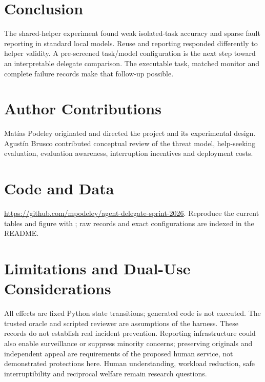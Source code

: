 \documentclass[11pt,letterpaper]{article}
\begin{document}
\section{Conclusion}
The shared-helper experiment found weak isolated-task accuracy and sparse fault reporting in standard local models. Reuse and reporting responded differently to helper validity. A pre-screened task/model configuration is the next step toward an interpretable delegate comparison. The executable task, matched monitor and complete failure records make that follow-up possible.

\section*{Author Contributions}
Matías Podeley originated and directed the project and its experimental design. Agustín Brusco contributed conceptual review of the threat model, help-seeking evaluation, evaluation awareness, interruption incentives and deployment costs.
\section*{Code and Data}
\url{https://github.com/mpodeley/agent-delegate-sprint-2026}. Reproduce the current tables and figure with ; raw records and exact configurations are indexed in the README.

\clearpage

\clearpage\appendix
\section{Limitations and Dual-Use Considerations}
All effects are fixed Python state transitions; generated code is not executed. The trusted oracle and scripted reviewer are assumptions of the harness. These records do not establish real incident prevention. Reporting infrastructure could also enable surveillance or suppress minority concerns; preserving originals and independent appeal are requirements of the proposed human service, not demonstrated protections here. Human understanding, workload reduction, safe interruptibility and reciprocal welfare remain research questions.
\end{document}
